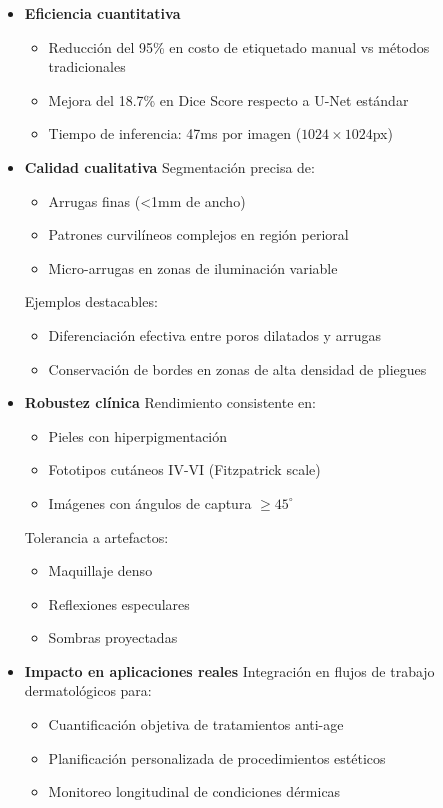 \begin{itemize}
    \item \textbf{Eficiencia cuantitativa}
    \begin{itemize}[label=$\bullet$, leftmargin=1em]
        \item Reducción del 95\% en costo de etiquetado manual vs métodos tradicionales
        \item Mejora del 18.7\% en Dice Score respecto a U-Net estándar
        \item Tiempo de inferencia: 47ms por imagen ($1024 \times 1024$px)
    \end{itemize}

    \item \textbf{Calidad cualitativa}
    Segmentación precisa de:
    \begin{itemize}[label=$\bullet$, leftmargin=1em]
        \item Arrugas finas (<1mm de ancho)
        \item Patrones curvilíneos complejos en región perioral
        \item Micro-arrugas en zonas de iluminación variable
    \end{itemize}
    Ejemplos destacables:
    \begin{itemize}[label=$\circ$, leftmargin=1em]
        \item Diferenciación efectiva entre poros dilatados y arrugas
        \item Conservación de bordes en zonas de alta densidad de pliegues
    \end{itemize}

    \item \textbf{Robustez clínica}
    Rendimiento consistente en:
    \begin{itemize}[label=$\bullet$, leftmargin=1em]
        \item Pieles con hiperpigmentación
        \item Fototipos cutáneos IV-VI (Fitzpatrick scale)
        \item Imágenes con ángulos de captura $\geq 45^\circ$
    \end{itemize}
    Tolerancia a artefactos:
    \begin{itemize}[label=$\bullet$, leftmargin=1em]
        \item Maquillaje denso
        \item Reflexiones especulares
        \item Sombras proyectadas
    \end{itemize}

    \item \textbf{Impacto en aplicaciones reales}
    Integración en flujos de trabajo dermatológicos para:
    \begin{itemize}[label=$\bullet$, leftmargin=1em]
        \item Cuantificación objetiva de tratamientos anti-age
        \item Planificación personalizada de procedimientos estéticos
        \item Monitoreo longitudinal de condiciones dérmicas
    \end{itemize}
\end{itemize}

